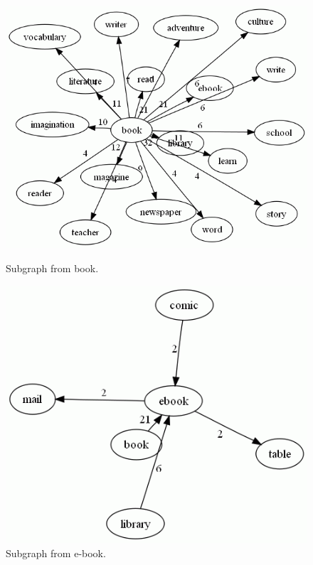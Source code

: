 \documentclass[english]{textolivre}
\begin{document}
\begin{figure}[htbp]
 \centering
 \begin{minipage}{.45\textwidth}
 \includegraphics[width=\textwidth]{Fig7.png}
 \caption{Subgraph from book.}
 \label{fig7}
 \end{minipage}%
 \qquad
 \begin{minipage}{0.45\textwidth}
 \includegraphics[width=\textwidth]{Fig8.png}
 \caption{Subgraph from e-book.}
 \label{fig8}
 \end{minipage}%
\end{figure}
\end{document}
